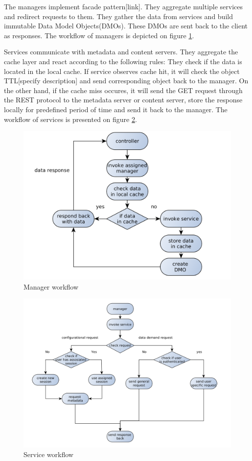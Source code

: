 The managers implement facade pattern[link]. They aggregate multiple services and redirect requests to them. They gather the data from services and build immutable Data Model Objects(DMOs). These DMOs are sent back to the client as responses. The workflow of managers is depicted on figure \ref{fig:via_manager}.

Services communicate with metadata and content servers. They aggregate the cache layer and react according to the following rules:
They check if the data is located in the local cache. If service observes cache hit, it will check the object TTL[specify description] and send corresponding object back to the manager. On the other hand, if the cache miss occures, it will send the GET request through the REST protocol to the metadata server or content server, store the response locally for predefined period of time and send it back to the manager. The workflow of services is presented on figure \ref{fig:via_service}.


\begin{figure}[h]
    \centering
	\includegraphics[width=\textwidth]{images/via_manager_1.png}
    \caption{Manager workflow}
    \label{fig:via_manager}
\end{figure}

\begin{figure}[h]
    \centering
	\includegraphics[width=\textwidth]{images/via_service_1.png}
    \caption{Service workflow}
    \label{fig:via_service}
\end{figure}


